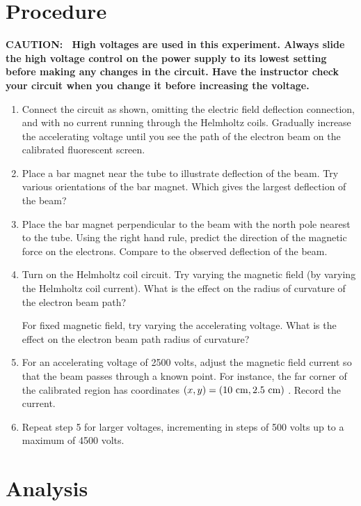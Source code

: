 \section{Procedure}

\textbf{CAUTION}\textbf{: \ High voltages are used in this experiment.
Always slide the high voltage control on the power supply to its lowest
setting before making any changes in the circuit. Have the instructor
check your circuit when you change it before increasing the
voltage.}

\begin{enumerate}
\item Connect the circuit as shown, omitting the electric
field deflection connection,  and with no current running through the
Helmholtz coils. Gradually increase the accelerating voltage until you
see the path of the electron beam on the calibrated fluorescent
screen.



\item Place a bar magnet near the tube to illustrate deflection of the beam. Try various orientations of the bar
magnet. Which gives the largest deflection of the beam?


\item Place the bar magnet perpendicular to the beam with the north pole
nearest to the tube. Using the right hand rule, predict the direction
of the magnetic force on the electrons. Compare to the observed
deflection of the beam.


\item Turn on the Helmholtz coil circuit. Try varying the
magnetic field (by varying the Helmholtz coil current). What is the
effect on the radius of curvature of the electron beam path?

For fixed magnetic field, try varying the accelerating voltage. What is
the effect on the electron beam path radius of curvature?


\item For an accelerating voltage of 2500 volts, adjust the magnetic field
  current so that the beam passes through a known point.  For instance, the far
  corner of the calibrated region has coordinates $(x,y) = (10~\rm{cm},
  2.5~\rm{cm})$ . Record the current.


\item Repeat step 5 for larger voltages, incrementing in
steps of 500 volts up to a maximum of 4500 volts.
\end{enumerate}

\section{Analysis}

